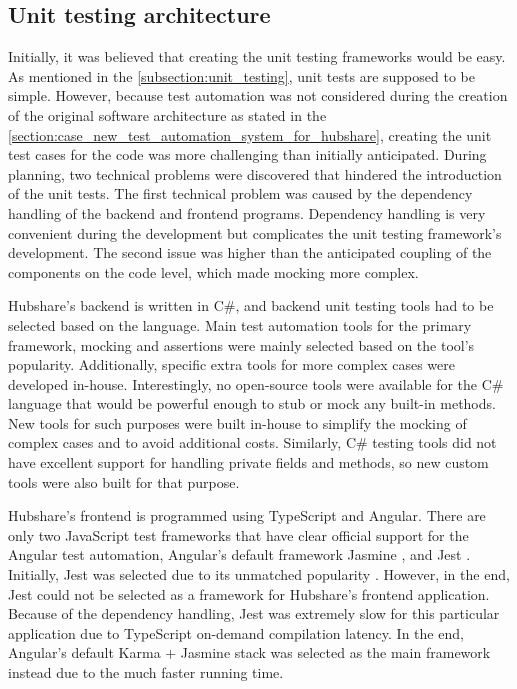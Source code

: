 \subsection{Unit testing architecture}
Initially, it was believed that creating the unit testing frameworks would be easy. As mentioned in the \autoref{subsection:unit_testing}, unit tests are supposed to be simple. However, because test automation was not considered during the creation of the original software architecture as stated in the \autoref{section:case_new_test_automation_system_for_hubshare}, creating the unit test cases for the code was more challenging than initially anticipated. During planning, two technical problems were discovered that hindered the introduction of the unit tests. The first technical problem was caused by the dependency handling of the backend and frontend programs. Dependency handling is very convenient during the development but complicates the unit testing framework's development. The second issue was higher than the anticipated coupling of the components on the code level, which made mocking more complex.

Hubshare's backend is written in C\#, and backend unit testing tools had to be selected based on the language. Main test automation tools for the primary framework, mocking and assertions were mainly selected based on the tool's popularity. Additionally, specific extra tools for more complex cases were developed in-house. Interestingly, no open-source tools were available for the C\# language that would be powerful enough to stub or mock any built-in methods. New tools for such purposes were built in-house to simplify the mocking of complex cases and to avoid additional costs. Similarly, C\# testing tools did not have excellent support for handling private fields and methods, so new custom tools were also built for that purpose.

Hubshare's frontend is programmed using TypeScript and Angular. There are only two JavaScript test frameworks that have clear official support for the Angular test automation, Angular's default framework Jasmine \cite{angular2022testing}, and Jest \cite{jest2022testing}. Initially, Jest was selected due to its unmatched popularity \cite{stateofjs2021}. However, in the end, Jest could not be selected as a framework for Hubshare's frontend application. Because of the dependency handling, Jest was extremely slow for this particular application due to TypeScript on-demand compilation latency. In the end, Angular's default Karma + Jasmine stack was selected as the main framework instead due to the much faster running time.

